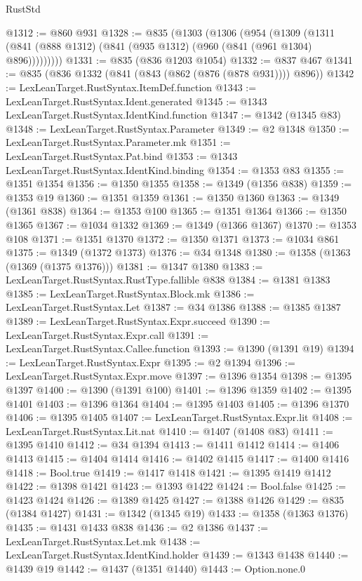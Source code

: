 \begin{lexlean}{RustStd}
\begin{coremodule}
{\begin{coremodule}
{{{{{{{{{{@1312 := @860 @931
@1328 := @835
    (@1303
      (@1306
        (@954
          (@1309 (@1311 (@841 (@888 @1312) (@841 (@935 @1312) (@960 (@841 (@961 @1304) @896)))))))))
@1331 := @835 (@836 @1203 @1054)
@1332 := @837 @467
@1341 := @835 (@836 @1332 (@841 (@843 (@862 (@876 (@878 @931)))) @896))
@1342 := LexLeanTarget.RustSyntax.ItemDef.function
@1343 := LexLeanTarget.RustSyntax.Ident.generated
@1345 := @1343 LexLeanTarget.RustSyntax.IdentKind.function
@1347 := @1342 (@1345 @83)
@1348 := LexLeanTarget.RustSyntax.Parameter
@1349 := @2 @1348
@1350 := LexLeanTarget.RustSyntax.Parameter.mk
@1351 := LexLeanTarget.RustSyntax.Pat.bind
@1353 := @1343 LexLeanTarget.RustSyntax.IdentKind.binding
@1354 := @1353 @83
@1355 := @1351 @1354
@1356 := @1350 @1355
@1358 := @1349 (@1356 @838)
@1359 := @1353 @19
@1360 := @1351 @1359
@1361 := @1350 @1360
@1363 := @1349 (@1361 @838)
@1364 := @1353 @100
@1365 := @1351 @1364
@1366 := @1350 @1365
@1367 := @1034 @1332
@1369 := @1349 (@1366 @1367)
@1370 := @1353 @108
@1371 := @1351 @1370
@1372 := @1350 @1371
@1373 := @1034 @861
@1375 := @1349 (@1372 @1373)
@1376 := @34 @1348
@1380 := @1358 (@1363 (@1369 (@1375 @1376)))
@1381 := @1347 @1380
@1383 := LexLeanTarget.RustSyntax.RustType.fallible @838
@1384 := @1381 @1383
@1385 := LexLeanTarget.RustSyntax.Block.mk
@1386 := LexLeanTarget.RustSyntax.Let
@1387 := @34 @1386
@1388 := @1385 @1387
@1389 := LexLeanTarget.RustSyntax.Expr.succeed
@1390 := LexLeanTarget.RustSyntax.Expr.call
@1391 := LexLeanTarget.RustSyntax.Callee.function
@1393 := @1390 (@1391 @19)
@1394 := LexLeanTarget.RustSyntax.Expr
@1395 := @2 @1394
@1396 := LexLeanTarget.RustSyntax.Expr.move
@1397 := @1396 @1354
@1398 := @1395 @1397
@1400 := @1390 (@1391 @100)
@1401 := @1396 @1359
@1402 := @1395 @1401
@1403 := @1396 @1364
@1404 := @1395 @1403
@1405 := @1396 @1370
@1406 := @1395 @1405
@1407 := LexLeanTarget.RustSyntax.Expr.lit
@1408 := LexLeanTarget.RustSyntax.Lit.nat
@1410 := @1407 (@1408 @83)
@1411 := @1395 @1410
@1412 := @34 @1394
@1413 := @1411 @1412
@1414 := @1406 @1413
@1415 := @1404 @1414
@1416 := @1402 @1415
@1417 := @1400 @1416
@1418 := Bool.true
@1419 := @1417 @1418
@1421 := @1395 @1419 @1412
@1422 := @1398 @1421
@1423 := @1393 @1422
@1424 := Bool.false
@1425 := @1423 @1424
@1426 := @1389 @1425
@1427 := @1388 @1426
@1429 := @835 (@1384 @1427)
@1431 := @1342 (@1345 @19)
@1433 := @1358 (@1363 @1376)
@1435 := @1431 @1433 @838
@1436 := @2 @1386
@1437 := LexLeanTarget.RustSyntax.Let.mk
@1438 := LexLeanTarget.RustSyntax.IdentKind.holder
@1439 := @1343 @1438
@1440 := @1439 @19
@1442 := @1437 (@1351 @1440)
@1443 := Option.none.{0}
}}}}}}}}}}
\end{coremodule}}
\end{coremodule}
\end{lexlean}
